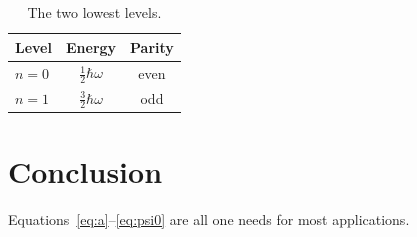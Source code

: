 \documentclass[11pt,a4paper]{article}
\begin{document}
\begin{table}[htbp]
  \centering
  \begin{tabular}{@{}lcc@{}}
    \toprule
    Level & Energy & Parity \\
    \midrule
    $n=0$ & $\tfrac12\hbar\omega$ & even \\
    $n=1$ & $\tfrac32\hbar\omega$ & odd \\
    \bottomrule
  \end{tabular}
  \caption{The two lowest levels.}
\end{table}

\section{Conclusion}
Equations~\eqref{eq:a}--\eqref{eq:psi0} are all one needs for most applications.



\end{document}
